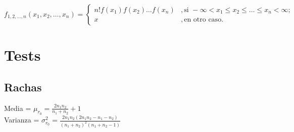 \documentclass[12pt]{article}
\newcommand{\N}{\mathscr{N}}
\begin{document}
\begin{tcolorbox}[colback=white,colframe=black,width=17cm ,coltitle=white, title = Distribución conjunta de $n$ estadísticos de orden ]
\begin{center}
\[
f_{1,2, \ldots, n}(x_1, x_2, \ldots, x_n) =
\begin{cases}
n! f(x_1)f(x_2) \ldots f(x_n) &, \text{si } -\infty < x_1 \leq x_2 \leq \ldots \leq x_n < \infty;\\
x &, \text{en otro caso}.
\end{cases}
\]
\end{center}
\end{tcolorbox}

\section{Tests}
\subsection*{Rachas}

\begin{center}
    

\begin{tcolorbox}[colback=white,colframe=black]

\begin{multicols}{2} 
\large{
\begin{center}


\large{
Media = $\mu_{r_0} = \frac{2 n_1 n_2}{n_1 + n_2} + 1$ \\
Varianza = $\sigma^2_{r_0}= \frac{2 n_1 n_2 (2 n_1 n_2 - n_1 - n_2)}{(n_1 + n_2)^2 (n_1 + n_2 -1)}$
}
\end{center}}

\end{multicols} 


\end{tcolorbox}
\end{center}
\end{document}
